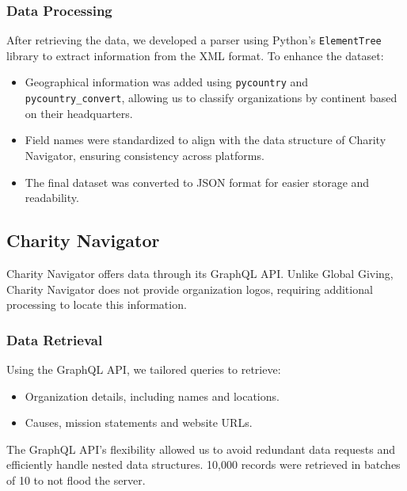 \documentclass[unicode,9pt,a4paper,oneside,numbers=endperiod,openany]{scrartcl}
\begin{document}
\subsubsection{Data Processing}

After retrieving the data, we developed a parser using Python's \texttt{ElementTree} library to extract information from the XML format. To enhance the dataset:
\begin{itemize}
\item Geographical information was added using \texttt{pycountry} and \texttt{pycountry\_convert}, allowing us to classify organizations by continent based on their headquarters.
\item Field names were standardized to align with the data structure of Charity Navigator, ensuring consistency across platforms.
\item The final dataset was converted to JSON format for easier storage and readability.
\end{itemize}

\subsection{Charity Navigator}
Charity Navigator offers data through its GraphQL API. Unlike Global Giving, Charity Navigator does not provide organization logos, requiring additional processing to locate this information.

\subsubsection{Data Retrieval}
Using the GraphQL API, we tailored queries to retrieve:
\begin{itemize}
\item Organization details, including names and locations.
\item Causes, mission statements and website URLs.
\end{itemize}
The GraphQL API's flexibility allowed us to avoid redundant data requests and efficiently handle nested data structures. 10,000 records were retrieved in batches of 10 to not flood the server.
\end{document}
